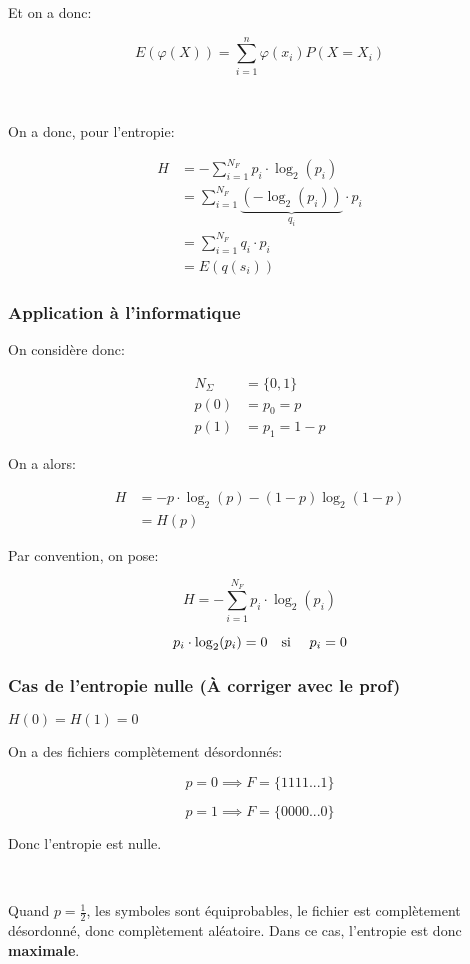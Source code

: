 \documentclass[a4paper,11pt]{article}
\newcommand{\ti}{\cdot}
\begin{document}
Et on a donc:

$$ E(\varphi(X)) = \sum_{i = 1}^n \varphi(x_i) P(X = X_i) $$

\

On a donc, pour l'entropie:

\begin{align*}
  H &= - \sum_{i = 1}^{N_F}p_i \ti \log_2(p_i) \\
    &= \sum_{i = 1}^{N_F} \underbrace{(- \log_2(p_i))}_{q_i} \ti p_i \\
    &= \sum_{i = 1}^{N_F} q_i \ti p_i \\
    &= E(q(s_i))
\end{align*}

\subsubsection{Application à l'informatique}

On considère donc:

\begin{align*}
  N_\Sigma &= \{0, 1\} \\
  p(0) &= p_0 = p \\
  p(1) &= p_1 = 1 - p
\end{align*}

On a alors:

\begin{align*}
  H &= -p \ti \log_2(p) - (1 - p) \log_2(1 - p) \\
    &= H(p)
\end{align*}

Par convention, on pose:

$$ H = - \sum_{i = 1}^{N_F}p_i \ti \log_2(p_i) $$

$$ p_i \ti \log_2(p_i) = 0 \text{\quad si \quad} p_i = 0 $$

\subsubsection{Cas de l'entropie nulle (À corriger avec le prof)}

$H(0) = H(1) = 0$

On a des fichiers complètement désordonnés:

$$ p = 0 \implies F = \{1111...1\} $$

$$ p = 1 \implies F = \{0000...0\} $$

Donc l'entropie est nulle.


\

Quand $p = \frac{1}{2}$, les symboles sont équiprobables, le fichier est
complètement désordonné, donc complètement aléatoire. Dans ce cas, l'entropie
est donc \textbf{maximale}.
\end{document}
